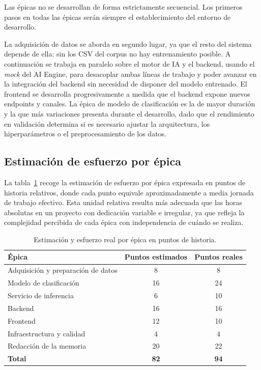 Las épicas no se desarrollan de forma estrictamente secuencial. Los primeros pasos en todas las épicas serán siempre el establecimiento del entorno de desarrollo.

La adquisición de datos se aborda en segundo lugar, ya que el resto del sistema depende de ella: sin los CSV del corpus no hay entrenamiento posible. A continuación se trabaja en paralelo sobre el motor de IA y el backend, usando el \emph{mock} del AI Engine, para desacoplar ambas líneas de trabajo y poder avanzar en la integración del backend sin necesidad de disponer del modelo entrenado. El frontend se desarrolla progresivamente a medida que el backend expone nuevos endpoints y canales. La épica de modelo de clasificación es la de mayor duración y la que más variaciones presenta durante el desarrollo, dado que el rendimiento en validación determina si es necesario ajustar la arquitectura, los hiperparámetros o el preprocesamiento de los datos.

\subsection{Estimación de esfuerzo por épica}

La tabla~\ref{tab:planificacion} recoge la estimación de esfuerzo por épica expresada en puntos de historia relativos, donde cada punto equivale aproximadamente a media jornada de trabajo efectivo. Esta unidad relativa resulta más adecuada que las horas absolutas en un proyecto con dedicación variable e irregular, ya que refleja la complejidad percibida de cada épica con independencia de cuándo se realiza.

\begin{table}[h]
\centering
\begin{tabular}{lcc}
\hline
\textbf{Épica} & \textbf{Puntos estimados} & \textbf{Puntos reales} \\
\hline
Adquisición y preparación de datos & 8 & 8 \\
Modelo de clasificación & 16 & 24 \\
Servicio de inferencia & 6 & 10 \\
Backend & 16 & 16 \\
Frontend & 12 & 10 \\
Infraestructura y calidad & 4 & 4 \\
Redacción de la memoria & 20 & 22 \\
\hline
\textbf{Total} & \textbf{82} & \textbf{94} \\
\hline
\end{tabular}
\caption{Estimación y esfuerzo real por épica en puntos de historia.}
\label{tab:planificacion}
\end{table}

